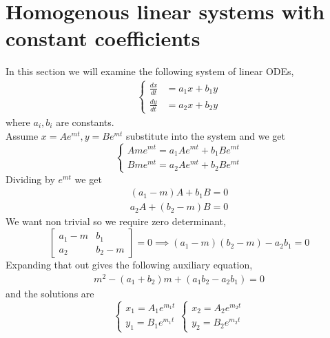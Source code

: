 \documentclass[oneside,11pt,pdftex,final]{book}%
\numberwithin{equation}{section}
\newtheorem{example}[theorem]{Example}
\numberwithin{section}{chapter}
\numberwithin{equation}{chapter}
\begin{document}
\section{Homogenous linear systems with constant coefficients}
In this section we will examine the following system of linear ODEs,
\begin{align}\label{def:constanthomo}
	\begin{cases}
		\frac{dx}{dt}&=a_1x+b_1y\\
		\frac{dy}{dt}&=a_2x+b_2y
	\end{cases}
\end{align}
where $ a_i,b_i $ are constants.\\
Assume $ x=Ae^{mt},y=Be^{mt} $ substitute into the system and we get 
\[ \begin{cases}
	Ame^{mt}=a_1Ae^{mt}+b_1Be^{mt}\\
	Bme^{mt}=a_2Ae^{mt}+b_2Be^{mt}
\end{cases} \]
Dividing by $ e^{mt} $ we get 
\begin{align*}
	(a_1-m)A+b_1B=0\\
	a_2A+(b_2-m)B=0
\end{align*}
We want non trivial so we require zero determinant,
\[ \begin{bmatrix}
	a_1-m & b_1\\
	a_2 & b_2-m
\end{bmatrix} =0 \implies (a_1-m)(b_2-m)-a_2b_1=0\] 
Expanding that out gives the following auxiliary equation,
\begin{align}\label{def:sysaux}
	m^2-(a_1+b_2)m+(a_1b_2-a_2b_1)=0
\end{align}
and the solutions are 
\[ \begin{cases}
	x_1=A_1e^{m_1t}\\
	y_1=B_1e^{m_1t}
\end{cases} \begin{cases}
x_2=A_2e^{m_2t}\\
y_2=B_2e^{m_2t}
\end{cases}
\]
\end{document}
